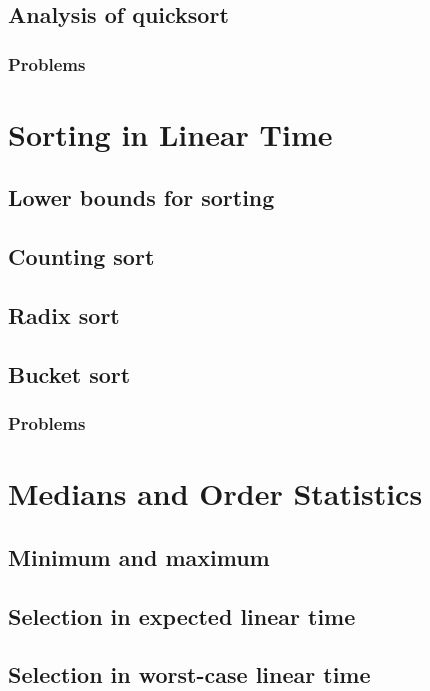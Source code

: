 \documentclass[fontsize=12pt,paper=a4,open=any]{book}
\begin{document}
\section{Analysis of quicksort}

\subsection*{Problems}


\chapter{Sorting in Linear Time}

\section{Lower bounds for sorting}

\section{Counting sort}

\section{Radix sort}

\section{Bucket sort}

\subsection*{Problems}


\chapter{Medians and Order Statistics}

\section{Minimum and maximum}

\section{Selection in expected linear time}

\section{Selection in worst-case linear time}
\end{document}
